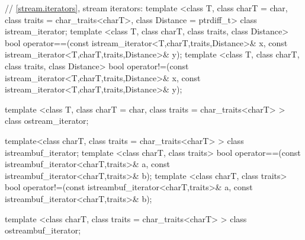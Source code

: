 \begin{codeblock}

  // \ref{stream.iterators}, stream iterators:
  template <class T, class charT = char, class traits = char_traits<charT>,
      class Distance = ptrdiff_t>
  class istream_iterator;
  template <class T, class charT, class traits, class Distance>
    bool operator==(const istream_iterator<T,charT,traits,Distance>& x,
            const istream_iterator<T,charT,traits,Distance>& y);
  template <class T, class charT, class traits, class Distance>
    bool operator!=(const istream_iterator<T,charT,traits,Distance>& x,
            const istream_iterator<T,charT,traits,Distance>& y);

  template <class T, class charT = char, class traits = char_traits<charT> >
      class ostream_iterator;

  template<class charT, class traits = char_traits<charT> >
    class istreambuf_iterator;
  template <class charT, class traits>
    bool operator==(const istreambuf_iterator<charT,traits>& a,
            const istreambuf_iterator<charT,traits>& b);
  template <class charT, class traits>
    bool operator!=(const istreambuf_iterator<charT,traits>& a,
            const istreambuf_iterator<charT,traits>& b);

  template <class charT, class traits = char_traits<charT> >
    class ostreambuf_iterator;


\end{codeblock}
